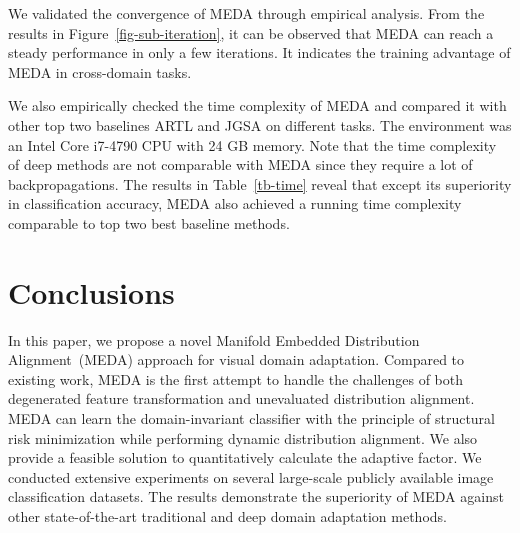 \documentclass[sigconf]{acmart}
\begin{document}
We validated the convergence of MEDA through empirical analysis. From the results in Figure~\ref{fig-sub-iteration}, it can be observed that MEDA can reach a steady performance in only a few  iterations. It indicates the training advantage of MEDA in cross-domain tasks.

We also empirically checked the time complexity of MEDA and compared it with other top two baselines ARTL and JGSA on different tasks. The environment was an Intel Core i7-4790 CPU with 24 GB memory. Note that the time complexity of deep methods are not comparable with MEDA since they require a lot of backpropagations. The results in Table~\ref{tb-time} reveal that except its superiority in classification accuracy, MEDA also achieved a running time complexity comparable to top two best baseline methods.

\begin{table}[]
	\centering
\caption{Running time~(s) of ARTL, JGSA, and MEDA.}
	\label{tb-time}
	\vspace{-.15in}
\vspace{-.2in}
\end{table}


\label{sec-con}
\section{Conclusions}

In this paper, we propose a novel Manifold Embedded Distribution Alignment~(MEDA) approach for visual domain adaptation. Compared to existing work, MEDA is the first attempt to handle the challenges of both degenerated feature transformation and unevaluated distribution alignment. MEDA can learn the domain-invariant classifier with the principle of structural risk minimization while performing dynamic distribution alignment. We also provide a feasible solution to quantitatively calculate the adaptive factor. We conducted extensive experiments on several large-scale publicly available image classification datasets. The results demonstrate the superiority of MEDA against other state-of-the-art traditional and deep domain adaptation methods. 
\end{document}
